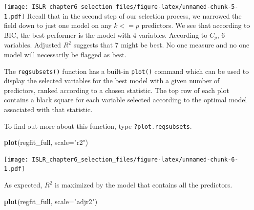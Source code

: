 \documentclass[
]{article}
\newenvironment{Shaded}{\begin{snugshade}}{\end{snugshade}}
\newcommand{\DataTypeTok}[1]{\textcolor[rgb]{0.13,0.29,0.53}{#1}}
\newcommand{\DecValTok}[1]{\textcolor[rgb]{0.00,0.00,0.81}{#1}}
\newcommand{\KeywordTok}[1]{\textcolor[rgb]{0.13,0.29,0.53}{\textbf{#1}}}
\newcommand{\NormalTok}[1]{#1}
\newcommand{\OperatorTok}[1]{\textcolor[rgb]{0.81,0.36,0.00}{\textbf{#1}}}
\newcommand{\StringTok}[1]{\textcolor[rgb]{0.31,0.60,0.02}{#1}}
\begin{document}
\begin{Shaded}
\end{Shaded}

\texttt{[image: ISLR\_chapter6\_selection\_files/figure-latex/unnamed-chunk-5-1.pdf]}
Recall that in the second step of our selection process, we narrowed the
field down to just one model on any \(k<=p\) predictors. We see that
according to BIC, the best performer is the model with 4 variables.
According to \(C_p\), 6 variables. Adjusted \(R^2\) suggests that 7
might be best. No one measure and no one model will necessarily be
flagged as best.

The \texttt{regsubsets()} function has a built-in \texttt{plot()}
command which can be used to display the selected variables for the best
model with a given number of predictors, ranked according to a chosen
statistic. The top row of each plot contains a black square for each
variable selected according to the optimal model associated with that
statistic.

To find out more about this function, type \texttt{?plot.regsubsets}.

\begin{Shaded}
\begin{Highlighting}[]
\KeywordTok{plot}\NormalTok{(regfit_full, }\DataTypeTok{scale=}\StringTok{"r2"}\NormalTok{)}
\end{Highlighting}
\end{Shaded}

\texttt{[image: ISLR\_chapter6\_selection\_files/figure-latex/unnamed-chunk-6-1.pdf]}

As expected, \(R^2\) is maximized by the model that contains all the
predictors.

\begin{Shaded}
\begin{Highlighting}[]
\KeywordTok{plot}\NormalTok{(regfit_full, }\DataTypeTok{scale=}\StringTok{"adjr2"}\NormalTok{)}
\end{Highlighting}
\end{Shaded}
\end{document}
